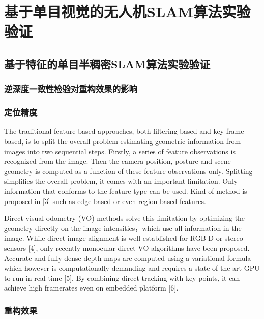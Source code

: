 
\chapter{基于单目视觉的无人机SLAM算法实验验证}
\label{chap:Experiment}


\section{基于特征的单目半稠密SLAM算法实验验证}

\subsection{逆深度一致性检验对重构效果的影响}

\subsection{定位精度}
The traditional feature-based approaches, both filtering-based and key frame-based, is to split the overall problem estimating geometric information from images into two sequential steps. Firstly, a series of feature observations is recognized from the image. Then the camera position, posture and scene geometry is computed as a function of these feature observations only. Splitting simplifies the overall problem, it comes with an important limitation. Only information that conforms to the feature type can be used. Kind of method is proposed in [3] such as edge-based or even region-based features.

Direct visual odometry (VO) methods solve this limitation by optimizing the geometry directly on the image intensities，which use all information in the image. While direct image alignment is well-established for RGB-D or stereo sensors [4], only recently monocular direct VO algorithms have been proposed. Accurate and fully dense depth maps are computed using a variational formula which however is computationally demanding and requires a state-of-the-art GPU to run in real-time [5]. By combining direct tracking with key points, it can achieve high framerates even on embedded platform [6].

\subsection{重构效果}


